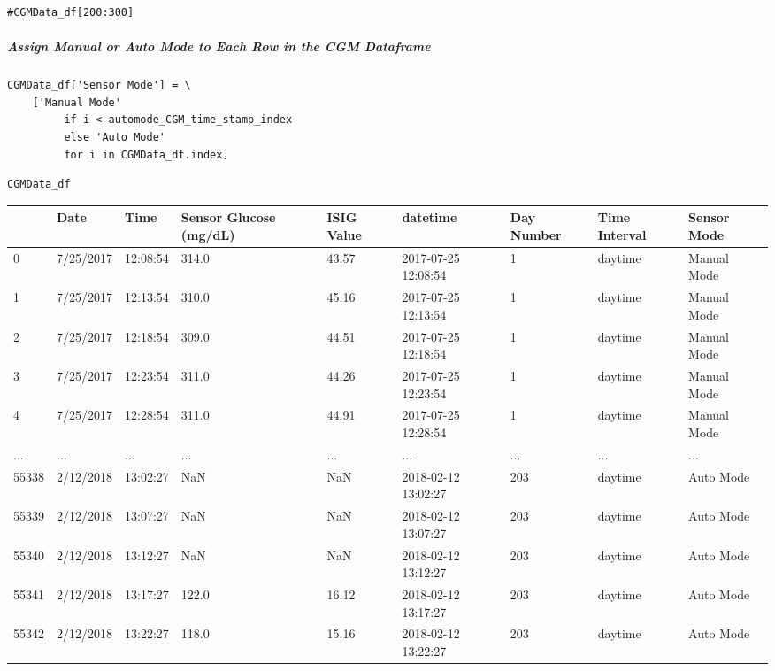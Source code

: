 \begin{verbatim}
#CGMData_df[200:300]
\end{verbatim}

\subparagraph{Assign Manual or Auto Mode to Each Row in the CGM Dataframe}

\begin{verbatim}
CGMData_df['Sensor Mode'] = \
    ['Manual Mode' 
         if i < automode_CGM_time_stamp_index 
         else 'Auto Mode'
         for i in CGMData_df.index]
\end{verbatim}

\begin{verbatim}
CGMData_df
\end{verbatim}

\bigskip\noindent
\begin{tabular}{p{}p{}p{}p{}p{}p{}p{}p{}p{}}
\toprule
 & Date & Time & Sensor Glucose (mg/dL) & ISIG Value & datetime & Day Number & Time Interval & Sensor Mode \\
\hline
0 & 7/25/2017 & 12:08:54 & 314.0 & 43.57 & 2017-07-25 12:08:54 & 1 & daytime & Manual Mode \\
\hline
1 & 7/25/2017 & 12:13:54 & 310.0 & 45.16 & 2017-07-25 12:13:54 & 1 & daytime & Manual Mode \\
\hline
2 & 7/25/2017 & 12:18:54 & 309.0 & 44.51 & 2017-07-25 12:18:54 & 1 & daytime & Manual Mode \\
\hline
3 & 7/25/2017 & 12:23:54 & 311.0 & 44.26 & 2017-07-25 12:23:54 & 1 & daytime & Manual Mode \\
\hline
4 & 7/25/2017 & 12:28:54 & 311.0 & 44.91 & 2017-07-25 12:28:54 & 1 & daytime & Manual Mode \\
\hline
... & ... & ... & ... & ... & ... & ... & ... & ... \\
\hline
55338 & 2/12/2018 & 13:02:27 & NaN & NaN & 2018-02-12 13:02:27 & 203 & daytime & Auto Mode \\
\hline
55339 & 2/12/2018 & 13:07:27 & NaN & NaN & 2018-02-12 13:07:27 & 203 & daytime & Auto Mode \\
\hline
55340 & 2/12/2018 & 13:12:27 & NaN & NaN & 2018-02-12 13:12:27 & 203 & daytime & Auto Mode \\
\hline
55341 & 2/12/2018 & 13:17:27 & 122.0 & 16.12 & 2018-02-12 13:17:27 & 203 & daytime & Auto Mode \\
\hline
55342 & 2/12/2018 & 13:22:27 & 118.0 & 15.16 & 2018-02-12 13:22:27 & 203 & daytime & Auto Mode \\
\hline
\bottomrule
\end{tabular}

